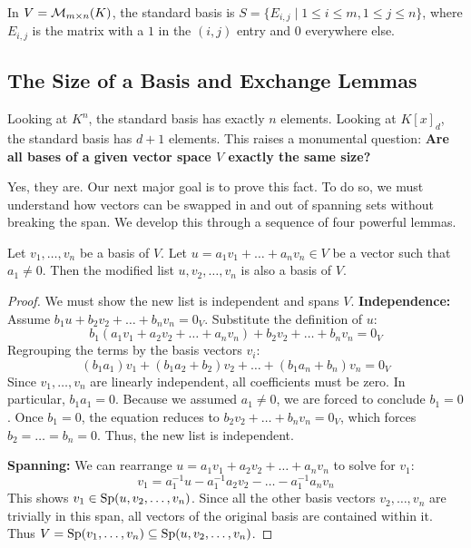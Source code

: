 \begin{example}[Matrices]
In $V = \mathcal{M}_{m \times n}(K)$, the standard basis is $S = \{E_{i,j} \mid 1 \le i \le m, 1 \le j \le n\}$, where $E_{i,j}$ is the matrix with a $1$ in the $(i,j)$ entry and $0$ everywhere else.
\end{example}

\subsection{The Size of a Basis and Exchange Lemmas}

Looking at $K^n$, the standard basis has exactly $n$ elements. Looking at $K[x]_d$, the standard basis has $d+1$ elements. This raises a monumental question:
\textbf{Are all bases of a given vector space $V$ exactly the same size?}

Yes, they are. Our next major goal is to prove this fact. To do so, we must understand how vectors can be swapped in and out of spanning sets without breaking the span. We develop this through a sequence of four powerful lemmas.

\begin{lemma}
Let $v_1, \dots, v_n$ be a basis of $V$. Let $u = a_1 v_1 + \dots + a_n v_n \in V$ be a vector such that $a_1 \ne 0$. Then the modified list $u, v_2, \dots, v_n$ is also a basis of $V$.
\end{lemma}

\begin{proof}
We must show the new list is independent and spans $V$.
\textbf{Independence:} Assume $b_1 u + b_2 v_2 + \dots + b_n v_n = 0_V$. Substitute the definition of $u$:
\[
b_1 (a_1 v_1 + a_2 v_2 + \dots + a_n v_n) + b_2 v_2 + \dots + b_n v_n = 0_V
\]
Regrouping the terms by the basis vectors $v_i$:
\[
(b_1 a_1) v_1 + (b_1 a_2 + b_2) v_2 + \dots + (b_1 a_n + b_n) v_n = 0_V
\]
Since $v_1, \dots, v_n$ are linearly independent, all coefficients must be zero. In particular, $b_1 a_1 = 0$. Because we assumed $a_1 \ne 0$, we are forced to conclude $b_1 = 0$. Once $b_1 = 0$, the equation reduces to $b_2 v_2 + \dots + b_n v_n = 0_V$, which forces $b_2 = \dots = b_n = 0$. Thus, the new list is independent.

\textbf{Spanning:} We can rearrange $u = a_1 v_1 + a_2 v_2 + \dots + a_n v_n$ to solve for $v_1$:
\[
v_1 = a_1^{-1} u - a_1^{-1} a_2 v_2 - \dots - a_1^{-1} a_n v_n
\]
This shows $v_1 \in \operatorname{Sp}(u, v_2, \dots, v_n)$. Since all the other basis vectors $v_2, \dots, v_n$ are trivially in this span, all vectors of the original basis are contained within it. Thus $V = \operatorname{Sp}(v_1, \dots, v_n) \subseteq \operatorname{Sp}(u, v_2, \dots, v_n)$.
\end{proof}

